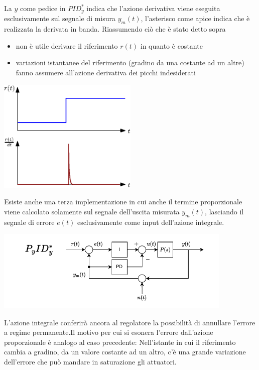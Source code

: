 \documentclass[10pt, letterpaper]{report}
\begin{document}
La $y$ come pedice in $PID_y^*$ indica che l'azione derivativa viene eseguita esclusivamente sul segnale di misura $y_m(t)$, l'asterisco come apice indica che è realizzata la derivata in banda.\acc 
Riassumendo ciò che è stato detto sopra \begin{itemize}
    \item non è utile derivare il riferimento $r(t)$ in quanto è costante
    \item variazioni istantanee del riferimento (gradino da una costante ad un altre) fanno assumere all'azione derivativa dei picchi indesiderati
\end{itemize}
\begin{center}
    \includegraphics[width=0.5\textwidth]{images/variazioneGradino.eps}
\end{center}
Esiste anche una terza implementazione in cui anche il termine proporzionale viene calcolato solamente sul segnale dell'uscita misurata $y_m(t)$, lasciando il segnale di errore $e(t)$ esclusivamente come input dell'azione integrale.\begin{center}
    \includegraphics[width=0.85\textwidth]{images/schemaPIDderivataPropUscita.pdf}
\end{center}
L'azione integrale conferirà ancora al regolatore la possibilità di annullare l'errore a regime permanente.\acc  Il motivo per cui si esonera l'errore dall'azione proporzionale è analogo al caso precedente: Nell'istante in cui il riferimento cambia a gradino, da un valore costante ad un altro, c'è una grande variazione dell'errore che può mandare in saturazione gli attuatori. 
\end{document}
